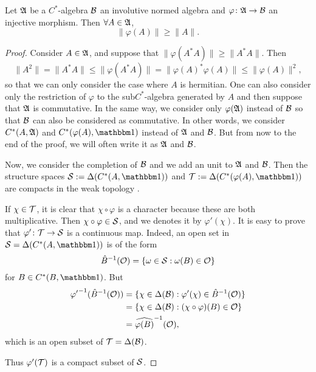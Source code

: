 \begin{proposition} \label{prop:vp_geq}
Let $\mathfrak{A}$ be a $C^{*}$-algebra $\mathcal{B}$ an involutive normed algebra and $\varphi\colon \mathfrak{A}\to \mathcal{B}$ an injective morphism. Then $\forall A\in\mathfrak{A}$,
\begin{equation}
   \|\varphi(A)\|\geq\|A\|.
\end{equation}
\end{proposition}

\begin{proof}
Consider $A\in\mathfrak{A}$, and suppose that $\|\varphi(A^*A)\|\geq\|A^*A\|$. Then
\[
\|A^2\|=\|A^*A\|\leq\|\varphi(A^*A)\|=\|\varphi(A)^*\varphi(A)\|\leq\|\varphi(A)\|^2,
\]
so that we can only consider the case where $A$ is hermitian. One can also consider only the restriction of $\varphi$ to the sub$C^{*}$-algebra generated by $A$ and then suppose that $\mathfrak{A}$ is commutative. In the same way, we consider only $\varphi(\mathfrak{A})$ instead of $\mathcal{B}$ so that $\mathcal{B}$ can also be considered as commutative. In other words, we consider $C^*(A,\mathfrak{A})$ and $C^*(\varphi(A),\mtu)$ instead of $\mathfrak{A}$ and $\mathcal{B}$. But from now to the end of the proof, we will often write it as $\mathfrak{A}$ and $\mathcal{B}$.

Now, we consider the completion of $\mathcal{B}$ and we add an unit to $\mathfrak{A}$ and $\mathcal{B}$. Then the structure spaces $\mS:=\Delta(C^*(A,\mtu))$ and $\mT:=\Delta(C^*(\varphi(A),\mtu))$ are compacts in the weak topology .

If $\chi\in\mathcal{T}$, it is clear that $\chi\circ\varphi$ is a character because these are both multiplicative. Then $\chi\circ\varphi\in\mathcal{S}$, and we denotes it by $\varphi'(\chi)$. It is easy to prove that $\varphi'\colon \mathcal{T}\to \mathcal{S}$ is a continuous map. Indeed, an open set in $\mS=\Delta(C^*(A,\mtu))$ is of the form
\[
  \hat{B}^{-1}(\mathcal{O})=\{ \omega\in\mathcal{S}:\omega(B)\in\mathcal{O}  \}
\]
 for $B\in C^*(B,\mtu)$. But
 \begin{equation}
\begin{split}
   {\varphi'}^{-1}(\hat{B}^{-1}(\mathcal{O}))&=\{ \chi\in\Delta(\mathcal{B}):\varphi'(\chi)\in\hat{B}^{-1}(\mathcal{O})  \}\\
                         &=\{ \chi\in\Delta(\mathcal{B}): (\chi\circ\varphi)(B)\in\mathcal{O}  \} \\
             &=\widehat{\varphi(B)}^{-1}(\mathcal{O}),
\end{split}
\end{equation}
which is an open subset of $\mathcal{T}=\Delta(\mathcal{B})$.
 
 Thus $\varphi'(\mathcal{T})$ is a compact subset of $\mathcal{S}$.


\end{proof}
